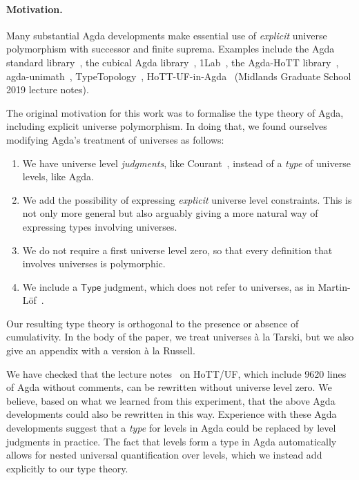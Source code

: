 \documentclass[11pt,a4paper]{article}
\theoremstyle{definition}
\newcommand{\Type}{\mathsf{Type}}
\begin{document}
\paragraph{Motivation.}
Many substantial Agda developments make essential use of \emph{explicit} universe polymorphism with successor and finite suprema. Examples include the Agda standard library~\cite{agda:stdlib}, the cubical Agda library~\cite{cubical:agda}, 1Lab~\cite{agda:1lab}, the Agda-HoTT library~\cite{hott:agda}, agda-unimath~\cite{agda:unimath}, TypeTopology~\cite{TypeTopology}, 
HoTT-UF-in-Agda~\cite{hott:uf:in:agda} (Midlands Graduate School 2019 lecture notes).

The original motivation for this work was to formalise the type theory of Agda, including explicit universe polymorphism. In doing that, we found ourselves modifying Agda's treatment of universes as follows:
\begin{enumerate}
\item We have universe level \emph{judgments}, like Courant~\cite{Courant02}, instead of a \emph{type} of universe levels, like Agda.

 \item We add the possibility of expressing \emph{explicit} universe level constraints. This is not only more general but also arguably giving a more natural way of expressing types involving universes.

 \item We do not require a first universe level zero, so that every definition that involves universes is polymorphic.

 \item We include a $\Type$ judgment, which does not refer to universes, as in Martin-L\"of~\cite{martinlof:hannover}.


\end{enumerate}

Our resulting type theory is orthogonal to the presence or absence of cumulativity. In the body of the paper, we treat universes \`a la Tarski, but we also give an appendix with a version \`a la Russell.


We have checked that the lecture notes~\cite{hott:uf:in:agda} on HoTT/UF, which include 9620 lines of Agda without comments, can be rewritten without universe level zero. We believe, based on what we learned from this experiment, that the above Agda developments could also be rewritten in this way. Experience with these Agda developments suggest that a \emph{type} for levels in Agda could be replaced by level judgments in practice. The fact that levels form a type in Agda automatically allows for nested universal quantification over levels, which we instead add explicitly to our type theory.
\end{document}
